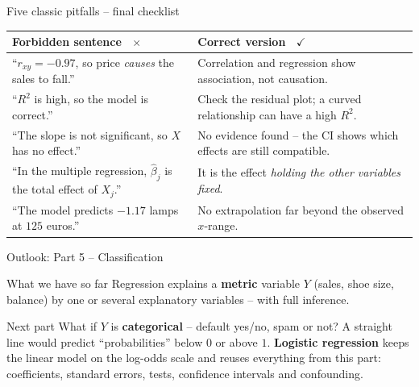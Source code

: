 \documentclass[aspectratio=169,11pt]{beamer}
\begin{document}
\begin{frame}{Five classic pitfalls -- final checklist}
  \small
  \begin{center}
    \renewcommand{\arraystretch}{1.45}
    \begin{tabular}{@{}>{\raggedright\arraybackslash}p{5.9cm}>{\raggedright\arraybackslash}p{6.7cm}@{}}
      \toprule
      \textbf{Forbidden sentence \ \textcolor{hsbirot}{$\times$}} &
      \textbf{Correct version \ \textcolor{hsbigruen}{$\checkmark$}}\\
      \midrule
      ``$r_{xy}=-0.97$, so price \emph{causes} the sales to fall.'' &
        Correlation and regression show association, not causation.\\
      ``$R^2$ is high, so the model is correct.'' &
        Check the residual plot; a curved relationship can have a high $R^2$.\\
      ``The slope is not significant, so $X$ has no effect.'' &
        No evidence found -- the CI shows which effects are still compatible.\\
      ``In the multiple regression, $\hat\beta_j$ is the total effect of $X_j$.'' &
        It is the effect \emph{holding the other variables fixed}.\\
      ``The model predicts $-1.17$ lamps at $125$ euros.'' &
        No extrapolation far beyond the observed $x$-range.\\
      \bottomrule
    \end{tabular}
  \end{center}
\end{frame}

\begin{frame}{Outlook: Part 5 -- Classification}
  \begin{block}{What we have so far}
    Regression explains a \textbf{metric} variable $Y$ (sales, shoe size,
    balance) by one or several explanatory variables -- with full inference.
  \end{block}
  \begin{block}{Next part}
    What if $Y$ is \textbf{categorical} -- default yes/no, spam or not? A
    straight line would predict ``probabilities'' below $0$ or above $1$.
    \textbf{Logistic regression} keeps the linear model on the log-odds
    scale and reuses everything from this part: coefficients, standard
    errors, tests, confidence intervals and confounding.
  \end{block}
\end{frame}
\end{document}
